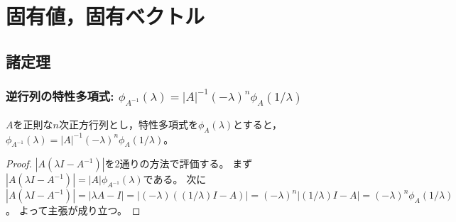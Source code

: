 \chapter{固有値，固有ベクトル}
    \section{諸定理}
        \subsection{逆行列の特性多項式: \texorpdfstring{$\phi_{A^{-1}}(\lambda) = |A|^{-1}(-\lambda)^n\phi_A(1/\lambda)$}{φA\string^(-1)(λ) = |A|\string^(-1)\string^n φA(1/λ)}}
            \begin{shadebox}
                $A$を正則な$n$次正方行列とし，特性多項式を$\phi_A(\lambda)$とすると，$\phi_{A^{-1}}(\lambda) = |A|^{-1}(-\lambda)^n\phi_A(1/\lambda)$。
            \end{shadebox}
            \begin{proof}
                $|A(\lambda I - A^{-1})|$を2通りの方法で評価する。
                まず$|A(\lambda I - A^{-1})| = |A|\phi_{A^{-1}}(\lambda)$である。
                次に$|A(\lambda I - A^{-1})| = |\lambda A - I| = |(-\lambda)((1/\lambda)I - A)| = (-\lambda)^n|(1/\lambda)I - A| = (-\lambda)^n\phi_A(1/\lambda)$。
                よって主張が成り立つ。
            \end{proof}
